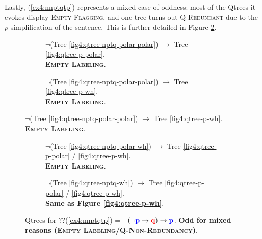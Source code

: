 Lastly, (\ref{ex4:nnptqtp}) represents a mixed case of oddness: most of the Qtrees it evokes display \textsc{Empty Flagging}, and one tree turns out \textsc{Q-Redundant} due to the $p$-simplification of the sentence. This is further detailed in Figure \ref{fig4:qtrees-n(nptq)tp}. 
\begin{figure}[H]
	\centering
	\begin{subfigure}[b]{.45\linewidth}
		\centering
		\scalebox{1}{
			\begin{forest}
				[CS[\p][$\neg\p$[\q][$\neg\p\cap\neg\q$]]]
			\end{forest}
		}
		\caption[]{$\neg$(Tree \ref{fig4:qtree-nptq-polar-polar}) $\rightarrow$ Tree \ref{fig4:qtree-p-polar}.\\ \textbf{\textsc{Empty Labeling}}.}
	\end{subfigure}
	\hfill
	\begin{subfigure}[b]{.45\linewidth}
		\centering
		\scalebox{1}{
			\begin{forest}
				[CS[\p][$\neg\p$[\q][$\neg\p\cap\neg\q$[\r][...]]]]
			\end{forest}
		}
		\caption[]{$\neg$(Tree \ref{fig4:qtree-nptq-polar-polar}) $\rightarrow$ Tree \ref{fig4:qtree-p-wh}.\\ \textbf{\textsc{Empty Labeling}}.}
	\end{subfigure}
\end{figure}
\begin{figure}[H]
\centering
\ContinuedFloat	
	\begin{subfigure}[b]{.45\linewidth}
		\centering
		\scalebox{1}{
			\begin{forest}
				[CS[\p][$\neg\p$[\q][\r][...]]]
			\end{forest}
		}
		\caption[]{$\neg$(Tree \ref{fig4:qtree-nptq-polar-wh}) $\rightarrow$ Tree \ref{fig4:qtree-p-polar} / \ref{fig4:qtree-p-wh}.\\ \textbf{\textsc{Empty Labeling}}.}
	\end{subfigure}
	\hfill
	\begin{subfigure}[b]{.45\linewidth}
		\centering
		\scalebox{1}{
			\begin{forest}
				[CS[\fbox{\p}][\q][\r][...]]
			\end{forest}
		}
		\caption[]{$\neg$(Tree \ref{fig4:qtree-nptq-wh}) $\rightarrow$ Tree \ref{fig4:qtree-p-polar} / \ref{fig4:qtree-p-wh}.\\ \textbf{Same as Figure \ref{fig4:qtree-p-wh}}.}\label{fig4:qtree-n(nptq)tp-wh}
	\end{subfigure}
	\caption[]{Qtrees for ??(\ref{ex4:nnptqtp}) = $\neg (\neg \textbf{\textcolor{blue}{p}} \rightarrow \textbf{\textcolor{red}{q}}) \rightarrow \textbf{\textcolor{blue}{p}}$. \textbf{Odd for mixed reasons (\textsc{Empty Labeling}/\textsc{Q-Non-Redundancy})}.}\label{fig4:qtrees-n(nptq)tp}
\end{figure}

